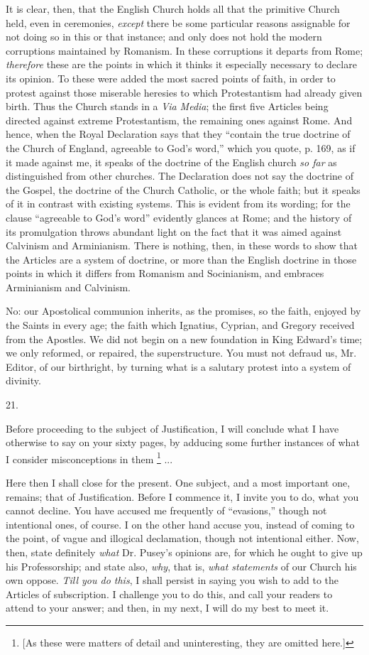 It is clear, then, that the English Church holds
all that the primitive Church held, even in ceremonies, \emph{except}
there be some particular reasons assignable for not doing so in this
or that instance; and only does not hold the modern corruptions
maintained by Romanism. In these corruptions it departs from Rome; \emph{therefore}
these are the points in which it thinks it especially necessary to
declare its opinion. To these were added the most sacred points of
faith, in order to protest against those miserable heresies to which
Protestantism had already given birth. Thus the Church stands in a \emph{Via
Media}; the first five Articles being directed against extreme
Protestantism, the remaining ones against Rome. And hence, when the
Royal Declaration says that they ``contain the true doctrine of the
Church of England, agreeable to God's word,'' which you quote, p. 169,
as if it made against me, it speaks of the doctrine of the English
church \emph{so far} as distinguished from other churches. The
Declaration does not say the doctrine of the Gospel, the doctrine of
the Church Catholic, or the whole faith; but it speaks of it in
contrast with existing systems. This is evident from its wording; for
the clause ``agreeable to God's word'' evidently glances at Rome; and
the history of its promulgation throws abundant light on the fact that
it was aimed against Calvinism and Arminianism. There is nothing,
then, in these words to show that the Articles are a system of
doctrine, or more than the English doctrine in those points in which
it differs from Romanism and Socinianism, and embraces Arminianism and
Calvinism.

No: our Apostolical communion inherits, as the
promises, so the faith, enjoyed by the Saints in every age; the faith
which Ignatius, Cyprian, and Gregory received from the Apostles. We
did not begin on a new foundation in King Edward's time; we only
reformed, or repaired, the superstructure. You must not defraud us,
Mr. Editor, of our birthright, by turning what is a salutary
protest into a system of divinity.

21.

Before proceeding to the subject of
Justification, I will conclude what I have otherwise to say on your
sixty pages, by adducing some further instances of what I consider
misconceptions in them \footnote{[As these were matters of detail and uninteresting, they are omitted
here.]}
...

Here then I shall close for the present. One
subject, and a most important one, remains; that of Justification.
Before I commence it, I invite you to do, what you cannot decline. You
have accused me frequently of ``evasions,'' though not intentional ones,
of course. I on the other hand accuse you, instead of coming to the
point, of vague and illogical declamation, though not intentional
either. Now, then, state definitely \emph{what} Dr. Pusey's opinions
are, for which he ought to give up his Professorship; and state also, \emph{why},
that is, \emph{what statements} of our Church his own oppose. \emph{Till
you do this}, I shall persist in saying you wish to add to the
Articles of subscription. I challenge you to do this, and call your
readers to attend to your answer; and then, in my next, I will do my
best to meet it.

